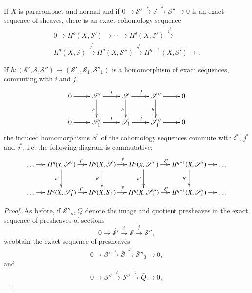 \begin{proposition}\label{chap13:prop9}%
If $X$ is paracompact and normal  and if $0 \to \mathscr{S'}
 \xrightarrow{i} \mathscr{S} \xrightarrow{j} \mathscr{S}'' \to 0$
 is an exact sequence of sheaves, there is an exact
cohomology sequence 
\begin{multline*}
0 \to  H^o(X, \mathscr{S'}) \to \cdots \to  H^q(X,\mathscr{S'})
\xrightarrow{i^*} \\
H^q(X, \mathscr{S}) \xrightarrow{j^*} H^q(X,
\mathscr{S''}) \xrightarrow{\delta^*} H^{q+1}(X,\mathscr{S'}) \to. 
\end{multline*}

If $h:(\mathscr{S'},\mathscr{S},\mathscr{S''}) \to
(\mathscr{S'}_1, \mathscr{S}_1,\mathscr{S''}_1)$ is a
  homomorphism of exact sequences, commuting with $i$ and $j$, 
\[
\xymatrix{
0\ar[r] & \mathscr{S}'\ar[r]^i\ar[d]_h & \mathscr{S} \ar[r]^j \ar[d]_h
& \mathscr{S}''\ar[r]\ar[d]_h & 0\\
0 \ar[r] & \mathscr{S}'_1 \ar[r]^i & \mathscr{S}_1 \ar[r]^j &
\mathscr{S}''_1 \ar[r] & 0
}
\]
the induced homomorphisms $S^*$ of the cohomology sequences commute
with $i^*$, $j^*$ and $\delta^*$, i.e. the following diagram is
commutative: 
{\fontsize{9}{11}\selectfont
\[
\xymatrix@C=0.45cm{
\ldots \ar[r] & H^q(x,\mathscr{S}')
\ar[r]^{i^{\ast}}\ar[d]_{h^{\ast}} & H^q 
(X,\mathscr{S})  \ar[r]^{j^{\ast}} \ar[d]_{h^{\ast}} &
H^q(x,\mathscr{S}'')\ar[r]^{\delta^{\ast}} \ar[d]_{h^{\ast}} &
H^{q+1}(X,\mathscr{S}') \ar[r]\ar[d]_{h^{\ast}} & \ldots\\
\ldots \ar[r] & H^q(X,\mathscr{S}'_1) \ar[r]^{i^{\ast}} & H^q (X,S_1)
\ar[r]^{j^{\ast}}& 
H^q(X,\mathscr{S}''_1) \ar[r]^{\delta^{\ast}} & H^{q+1}
(X,\mathscr{S}'_1) \ar[r] & \ldots
}
\]}\relax
\end{proposition}

\begin{proof}
As before, if $\bar{\mathscr{S}}''_o$, $\bar{Q}$ denote the image and
quotient presheaves in the exact sequence of presheaves of sections 
$$
0 \to \bar{\mathscr{S'}} \xrightarrow{i} \bar{\mathscr{S}}
\xrightarrow{j} \bar{\mathscr{S}}'', 
$$
we\pageoriginale obtain the exact sequence of presheaves
$$
0 \to \bar{\mathscr{S'}} \xrightarrow{i} \bar{\mathscr{S}}
\xrightarrow{j_0} \bar{\mathscr{S}}''_0 \to 0, 
$$
and 
$$
0 \to \bar{\mathscr{S}''} \xrightarrow{\bar{i}} \bar{\mathscr{S}''}
\xrightarrow{\bar{j}} \bar{Q} \to 0, 
$$
\end{proof}

